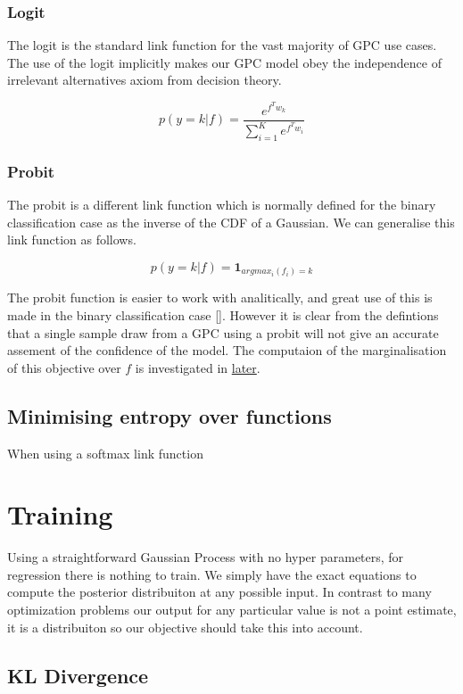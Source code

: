 \documentclass[12pt, a4paper]{report}
\theoremstyle{definition}
\begin{document}
\subsubsection{Logit}

The logit is the standard link function for the vast majority of GPC use cases. The use of the logit implicitly makes our GPC model obey the independence of irrelevant alternatives axiom from decision theory. 


$$p\left( y = k | f\right) = \frac{e^{f^T w_k}}{\sum_{i=1}^{K} e^{f^T w_i}}$$
\subsubsection{Probit}

The probit is a different link function which is normally defined for the binary classification case as the inverse of the CDF of a Gaussian. We can generalise this link function as follows.

$$p\left(y = k | f\right) = \mathbf{1}_{argmax_i(f_i) = k}$$


The probit function is easier to work with analitically, and great use of this is made in the binary classification case []. However it is clear from the defintions that a single sample draw from a GPC using a probit will not give an accurate assement of the confidence of the model. The computaion of the marginalisation of this objective over $f$ is investigated in \hyperref[sec:Integration]{later}.

\subsection{Minimising entropy over functions}

When using a softmax link function


\section{Training}

Using a straightforward Gaussian Process with no hyper parameters, for regression there is nothing to train. We simply have the exact equations to compute the posterior distribuiton at any possible input. In contrast to many optimization problems our output for any particular value is not a point estimate, it is a distribuiton so our objective should take this into account.


\subsection{KL Divergence}
\end{document}
